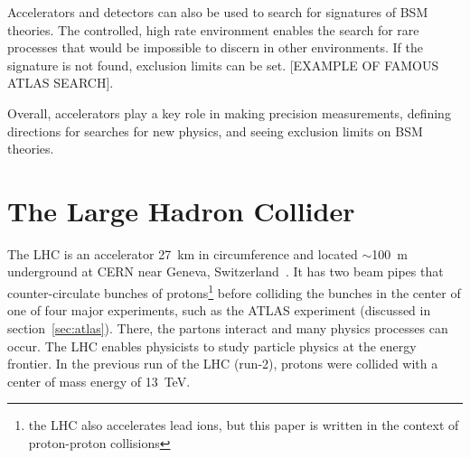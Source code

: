 Accelerators and detectors can also be used to search for signatures of BSM theories. The controlled, high rate environment enables the search for rare processes that would be impossible to discern in other environments. If the signature is not found, exclusion limits can be set. [EXAMPLE OF FAMOUS ATLAS SEARCH].

Overall, accelerators play a key role in making precision measurements, defining directions for searches for new physics, and seeing exclusion limits on BSM theories.

\section{The Large Hadron Collider}

The LHC is an accelerator \SI{27}{\kilo\meter} in circumference and located $\sim$\SI{100}{\meter} underground at CERN near Geneva, Switzerland~\cite{evans_lhc_2008}. It has two beam pipes that counter-circulate bunches of protons\footnote{the LHC also accelerates lead ions, but this paper is written in the context of proton-proton collisions} before colliding the bunches in the center of one of four major experiments, such as the ATLAS experiment (discussed in section~\ref{sec:atlas}). There, the partons interact and many physics processes can occur. The LHC enables physicists to study particle physics at the energy frontier. In the previous run of the LHC (run-2), protons were collided with a center of mass energy of \SI{13}{\tera\electronvolt}. 


